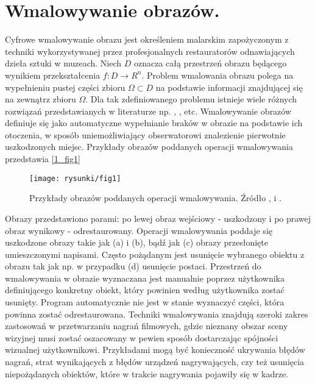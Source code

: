 \documentclass[12pt, twoside, openany]{report}
\theoremstyle{definition}
\begin{document}
\section{Wmalowywanie obrazów.}
Cyfrowe wmalowywanie obrazu jest określeniem malarskim zapożyczonym z techniki wykorzystywanej przez profesjonalnych restauratorów odnawiających dzieła sztuki w muzeach. Niech $D$ oznacza całą przestrzeń obrazu będącego wynikiem przekształcenia $f: D \rightarrow R^{n}$. Problem wmalowania obrazu polega na wypełnieniu pustej części zbioru $\Omega \subset D$ na podstawie informacji znajdującej się na zewnątrz zbioru $\Omega$. Dla tak zdefiniowanego problemu istnieje wiele różnych rozwiązań przedstawianych w literaturze np. \cite{SalientStrucTexProp}, \cite{BertalmioNavierStokes}, \cite{arias2011variational} etc. Wmalowywanie obrazów definiuje się jako automatyczne wypełnianie braków w obrazie na podstawie ich otoczenia, w sposób uniemożliwiający obserwatorowi znalezienie pierwotnie uszkodzonych miejsc. Przykłady obrazów poddanych operacji wmalowywania przedstawia \autoref{1_fig1} 
\begin{figure}[!h]
	\centering
	\texttt{[image: rysunki/fig1]}
	\caption{Przykłady obrazów poddanych operacji wmalowywania. Źródło \cite{BertalmioNavierStokes}, \cite{bertalmio2000image} i \cite{patwardhan2007video}.}
	\label{1_fig1}
\end{figure}
\par
Obrazy przedstawiono parami: po lewej obraz wejściowy - uszkodzony i po prawej obraz wynikowy - odrestaurowany. Operacji wmalowywania poddaje się uszkodzone obrazy takie jak (a) i (b), bądź jak (c) obrazy przesłonięte umieszczonymi napisami. Często pożądanym jest usunięcie wybranego obiektu z obrazu tak jak np. w przypadku (d) usunięcie postaci. Przestrzeń do wmalowywania w obrazie wyznaczana jest manualnie poprzez użytkownika definiującego konkretny obiekt, który powinien według użytkownika zostać usunięty. Program automatycznie nie jest w stanie wyznaczyć części, która powinna zostać odrestaurowana. 
Techniki wmalowywania znajdują szeroki zakres zastosowań w przetwarzaniu nagrań filmowych, gdzie nieznany obszar sceny wizyjnej musi zostać oszacowany w pewien sposób dostarczając spójności wizualnej użytkownikowi. Przykładami mogą być konieczność ukrywania błędów nagrań, strat wynikających z błędów urządzeń nagrywających, czy też usunięcia niepożądanych obiektów, które w trakcie nagrywania pojawiły się w kadrze. 
\end{document}
